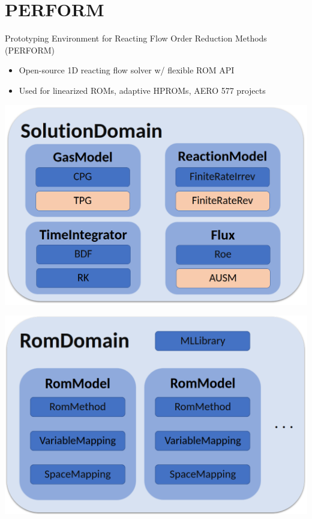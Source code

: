 \documentclass[]{beamer}
\begin{document}
\section*{PERFORM}

\begin{frame}{\footnotesize{Prototyping Environment for Reacting Flow Order Reduction Methods (PERFORM)}}
	\begin{itemize}
		\small
		\item Open-source 1D reacting flow solver w/ flexible ROM API\footnotemark[9]
		\item Used for linearized ROMs\footnotemark[10], adaptive HPROMs\footnotemark[11], AERO 577 projects
		\normalsize
	\end{itemize}
	\vspace{0.5em}
	\begin{minipage}{0.49\linewidth}
		\includegraphics[width=0.99\linewidth]{Images/experiments/transientFlame/performFOMAPI.png}
	\end{minipage}
	\begin{minipage}{0.49\linewidth}
		\includegraphics[width=0.99\linewidth]{Images/experiments/transientFlame/performROMAPI.png}
	\end{minipage}


\end{frame}
\end{document}

